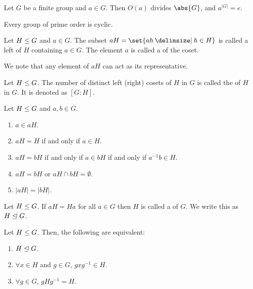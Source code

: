 \documentclass[11pt]{penrose}
\begin{document}
\begin{ncor}
    Let $G$ be a finite group and $a \in G$. Then $O(a)$ divides $\abs{G}$, and $a^{|G|} = e$.
\end{ncor}

\begin{ncor}
    Every group of prime order is cyclic.
\end{ncor}

\begin{ndfn}[Cosets]
    Let $H \mathrel{\leq} G$ and $a \in G$. The subset $aH = \set{ah \st h \in H}$ is called a left  of $H$ containing $a \in G$. The element $a$ is called a  of the coset.
\end{ndfn}

We note that any element of $aH$ can act as its representative.

\begin{ndfn}[Index]
    Let $H \mathrel{\leq} G$. The number of distinct left (right) cosets of $H$ in $G$ is called the  of $H$ in $G$. It is denoted as $[G:H]$.
\end{ndfn}

\begin{nthm}
    Let $H \mathrel{\leq} G$ and $a, b \in G$.
    \begin{enumerate}
        \item $a \in aH$.
        \item $aH = H$ if and only if $a \in H$.
        \item $aH = bH$ if and only if $a \in bH$ if and only if $a^{-1} b \in H$.
        \item $aH = bH$ or $aH \cap bH = \emptyset$.
        \item $|aH| = |bH|$.
    \end{enumerate}
\end{nthm}

\begin{ndfn}
    Let $H \mathrel{\leq} G$. If $aH = Ha$ for all $a \in G$ then $H$ is called a  of $G$. We write this as $H \mathrel{\trianglelefteq} G$.
\end{ndfn}

\begin{nthm}
    Let $H \mathrel{\leq} G$. Then, the following are equivalent:
    \begin{enumerate}
        \item $H \mathrel{\trianglelefteq} G$.
        \item $\forall x \in H$ and $g \in G$, $g x g^{-1} \in H$.
        \item $\forall g \in G$, $g H g^{-1} = H$.
    \end{enumerate}
\end{nthm}
\end{document}
